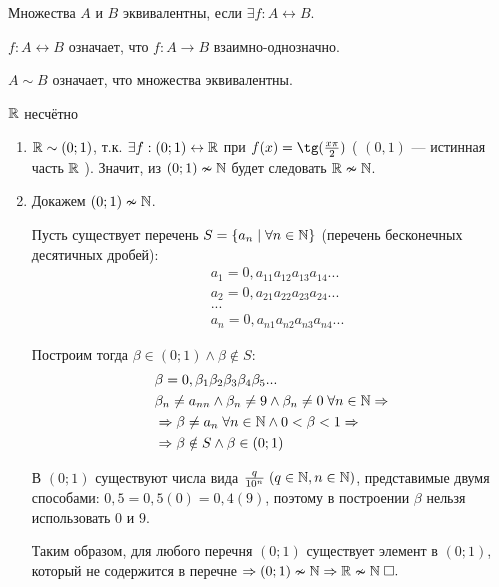 \documentclass{article}
\begin{document}


Множества $A$ и $B$	эквивалентны, если $\exists f:A\leftrightarrow B$.

$f:A\leftrightarrow B$ означает, что $f:A\to B$ взаимно-однозначно.

$A\sim B$ означает, что множества эквивалентны.

\theorem

$\mathbb{R}$ несчётно

\proof
\begin{enumerate}
	\item{}$\mathbb{R}\sim(0;1)$, т.к. $\exists f:(0;1)\leftrightarrow\mathbb{R}$ при $f(x)=\tg(\frac{x\pi}{2})$ ( $(0,1) $ --- истинная часть $\mathbb{R}$ ). Значит, из $(0;1)\nsim\mathbb{N}$ будет следовать $\mathbb{R}\nsim\mathbb{N}$.
	\item{}Докажем $(0;1)\nsim\mathbb{N}$.

	Пусть существует перечень $S=\{a_n\;|\;\forall n\in\mathbb{N}\}$ (перечень бесконечных десятичных дробей):
	\begin{align*}
		 & a_1=0,a_{11}a_{12}a_{13}a_{14}... \\
		 & a_2=0,a_{21}a_{22}a_{23}a_{24}... \\
		 & ... \\
          & a_n=0,a_{n1}a_{n2}a_{n3}a_{n4}... 
	\end{align*}

	Построим тогда $\beta\in(0;1)\land\beta\notin S$:
	\begin{align*}
		 & \beta=0,\beta_1\beta_2\beta_3\beta_4\beta_5...                               \\
		 & \beta_n\neq a_{nn}\land \beta_n\neq 9\land\beta_n\neq 0\;\forall n\in\mathbb{N}\Rightarrow \\
		 & \Rightarrow \beta\neq a_n\;\forall n\in\mathbb{N} \land  0<\beta<1\Rightarrow                      \\
		 & \Rightarrow \beta\notin S\land \beta\in(0;1)
	\end{align*}

	В $(0;1)$ существуют числа вида $\frac{q}{10^{n}}\;(q\in\mathbb{N},n\in\mathbb{N})$, представимые двумя способами:
	$0,5=0,5(0)=0,4(9)$, поэтому в построении $\beta$ нельзя использовать $0$ и $9$.

	Таким образом, для любого перечня $(0;1)$ существует элемент в $(0;1)$, который не содержится в перечне $\Rightarrow(0;1)\nsim\mathbb{N}\Rightarrow\mathbb{R}\nsim\mathbb{N}\;\square.$

\end{enumerate}
\end{document}
